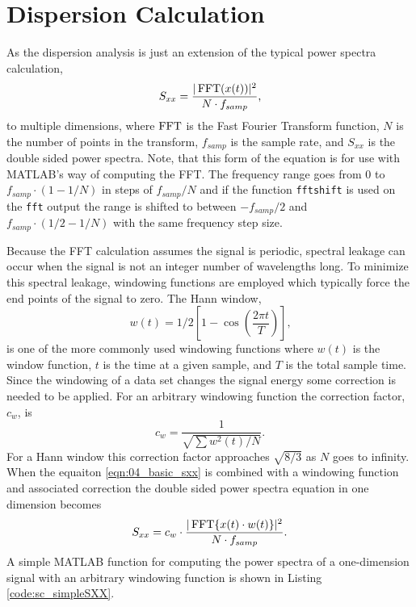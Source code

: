 \section{Dispersion Calculation}
As the dispersion analysis is just an extension of the typical power spectra calculation,
\begin{equation}
 S_{xx} = \frac{|\operatorname{FFT}(x(t))|^2}{N\cdot f_{samp}} \textrm{,}
 \label{eqn:04_basic_sxx}
\end{equation}
to multiple dimensions, where $\operatorname{FFT}$ is the Fast Fourier Transform function, $N$ is the number of points in the transform, $f_{samp}$ is the sample rate, and $S_{xx}$ is the double sided power spectra.
Note, that this form of the equation is for use with MATLAB's way of computing the FFT.
The frequency range goes from $0$ to $f_{samp}\cdot(1-1/N)$ in steps of $f_{samp}/N$ and if the function \lstinline{fftshift} is used on the \lstinline{fft} output the range is shifted to between $-f_{samp}/2$ and $f_{samp}\cdot(1/2-1/N)$ with the same frequency step size.

Because the FFT calculation assumes the signal is periodic, spectral leakage can occur when the signal is not an integer number of wavelengths long.
To minimize this spectral leakage, windowing functions are employed which typically force the end points of the signal to zero.
The Hann window,
\begin{equation}
 w(t) = 1/2\left[1-\cos\left(\frac{2\pi t}{T}\right)\right] \textrm{,}
 \label{eqn:04_hann_window}
\end{equation}
is one of the more commonly used windowing functions where $w(t)$ is the window function, $t$ is the time at a given sample, and $T$ is the total sample time.
Since the windowing of a data set changes the signal energy some correction is needed to be applied.
For an arbitrary windowing function the correction factor, $c_w$, is
\begin{equation}
 c_w = \frac{1}{\sqrt{\sum w^2(t)/N}} \textrm{.}
 \label{eqn:04_window_correction}
\end{equation}
For a Hann window this correction factor approaches $\sqrt{8/3}$ as $N$ goes to infinity.
When the equaiton \ref{eqn:04_basic_sxx} is combined with a windowing function and associated correction the double sided power spectra equation in one dimension becomes
\begin{equation}
 S_{xx} = c_w\cdot\frac{|\operatorname{FFT}\{x(t)\cdot w(t)\}|^2}{N\cdot f_{samp}} \textrm{.}
 \label{eqn:04_windowed_sxx}
\end{equation}
A simple MATLAB function for computing the power spectra of a one-dimension signal with an arbitrary windowing function is shown in Listing \ref{code:sc_simpleSXX}.

